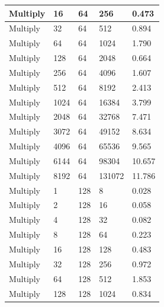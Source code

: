 \documentclass{article}
\begin{document}
\begin{longtable}{|l|l|l|l|l|}
Multiply           & 16   & 64          & 256               & 0.473             \\ \hline
Multiply           & 32   & 64          & 512               & 0.894             \\ \hline
Multiply           & 64   & 64          & 1024              & 1.790             \\ \hline
Multiply           & 128  & 64          & 2048              & 0.664             \\ \hline
Multiply           & 256  & 64          & 4096              & 1.607             \\ \hline
Multiply           & 512  & 64          & 8192              & 2.413             \\ \hline
Multiply           & 1024 & 64          & 16384             & 3.799             \\ \hline
Multiply           & 2048 & 64          & 32768             & 7.471             \\ \hline
Multiply           & 3072 & 64          & 49152             & 8.634             \\ \hline
Multiply           & 4096 & 64          & 65536             & 9.565             \\ \hline
Multiply           & 6144 & 64          & 98304             & 10.657            \\ \hline
Multiply           & 8192 & 64          & 131072            & 11.786            \\ \hline
Multiply           & 1    & 128         & 8                 & 0.028             \\ \hline
Multiply           & 2    & 128         & 16                & 0.058             \\ \hline
Multiply           & 4    & 128         & 32                & 0.082             \\ \hline
Multiply           & 8    & 128         & 64                & 0.223             \\ \hline
Multiply           & 16   & 128         & 128               & 0.483             \\ \hline
Multiply           & 32   & 128         & 256               & 0.972             \\ \hline
Multiply           & 64   & 128         & 512               & 1.853             \\ \hline
Multiply           & 128  & 128         & 1024              & 0.834             \\ \hline

\end{longtable}
\end{document}
